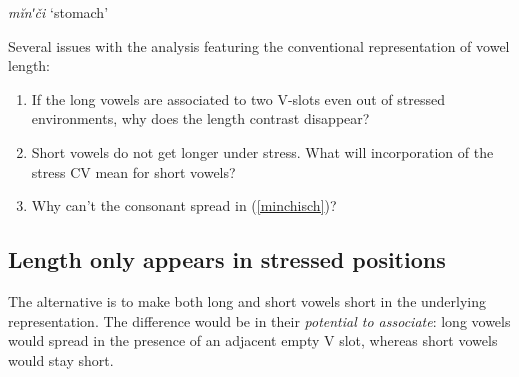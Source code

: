 \documentclass[a4paper, 12pt]{article}
\begin{document}
			\ex\label{minchisch}\emph{mĭnʹči} `stomach' \\
			\xe		
	Several issues with the analysis featuring the conventional representation of vowel length:
	
	\begin{enumerate}[$\gg$]
		\item If the long vowels are associated to two V-slots even out of stressed environments, why does the length contrast disappear?
		\item Short vowels do not get longer under stress. What will incorporation of the stress CV mean for short vowels?
		\item Why can't the consonant spread in (\ref{minchisch})?
	\end{enumerate}
	
			\subsection{Length only appears in stressed positions}
			
	The alternative is to make both long and short vowels short in the underlying representation. The difference would be in their \emph{potential to associate}: long vowels would spread in the presence of an adjacent empty V slot, whereas short vowels would stay short.
	
\end{document}
